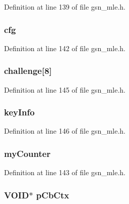 Definition at line 139 of file gsn\_\-mle.h.

\hypertarget{a00151_a81fc5c006f1e1f6bfd4a7a206ba6e610}{
\subsubsection[{cfg}]{ {\bf cfg}}}
\label{a00151_a81fc5c006f1e1f6bfd4a7a206ba6e610}


Definition at line 142 of file gsn\_\-mle.h.

\hypertarget{a00151_ac937b0da946c4120665c2ba4bcbaf5a9}{
\subsubsection[{challenge}]{ {\bf challenge}\mbox{[}8\mbox{]}}}
\label{a00151_ac937b0da946c4120665c2ba4bcbaf5a9}


Definition at line 145 of file gsn\_\-mle.h.

\hypertarget{a00151_a55a650fe64ce13e9dcc109ab137aabdf}{
\subsubsection[{keyInfo}]{ {\bf keyInfo}}}
\label{a00151_a55a650fe64ce13e9dcc109ab137aabdf}


Definition at line 146 of file gsn\_\-mle.h.

\hypertarget{a00151_ad89adacdba574e0d7930140bfe96663f}{
\subsubsection[{myCounter}]{ {\bf myCounter}}}
\label{a00151_ad89adacdba574e0d7930140bfe96663f}


Definition at line 143 of file gsn\_\-mle.h.

\hypertarget{a00151_a040e2d4627baec5f0f81086400c1b66a}{
\subsubsection[{pCbCtx}]{\setlength{\rightskip}{0pt plus 5cm}VOID$\ast$ {\bf pCbCtx}}}
\label{a00151_a040e2d4627baec5f0f81086400c1b66a}


